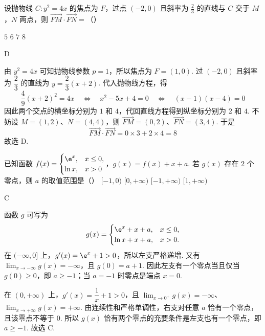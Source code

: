 \begin{problem}
设抛物线 \(C:y^2=4x\) 的焦点为 \(F\)，过点 \((-2,0)\) 且斜率为 \(\frac23\) 的直线与 \(C\) 交于 \(M\)，\(N\) 两点，则 \(\overrightarrow{FM}\cdot\overrightarrow{FN}=\)（\quad）

\choices
    {\(5\)}
    {\(6\)}
    {\(7\)}
    {\(8\)}
\end{problem}

\begin{answer}
D
\end{answer}

\begin{solution}
由 \(y^2=4x\) 可知抛物线参数 \(p=1\)，所以焦点为 \(F=(1,0)\). 过 \((-2,0)\) 且斜率为 \(\dfrac23\) 的直线为 \(y=\dfrac23(x+2)\). 代入抛物线方程，得
\[
\frac49(x+2)^2=4x
\quad\Longleftrightarrow\quad
x^2-5x+4=0
\quad\Longleftrightarrow\quad
(x-1)(x-4)=0
\]
因此两个交点的横坐标分别为 \(1\) 和 \(4\)，代回直线方程得到纵坐标分别为 \(2\) 和 \(4\). 不妨设 \(M=(1,2)\)、\(N=(4,4)\)，则 \(\overrightarrow{FM}=(0,2)\)、\(\overrightarrow{FN}=(3,4)\). 于是
\[
\overrightarrow{FM}\cdot\overrightarrow{FN}=0\times3+2\times4=8
\]
故选 D.
\end{solution}

\begin{problem}
已知函数 \(f(x)=\begin{cases}
\e^x,&x\le0,\\
\ln x,&x>0
\end{cases}\)，\(g(x)=f(x)+x+a\). 若 \(g(x)\) 存在 \(2\text{ 个}\) 零点，则 \(a\) 的取值范围是（\quad）
\choices
    {\([-1,0)\)}
    {\([0,+\infty)\)}
    {\([-1,+\infty)\)}
    {\([1,+\infty)\)}
\end{problem}

\begin{answer}
C
\end{answer}

\begin{solution}
函数 \(g\) 可写为
\[
g(x)=
\begin{cases}
\e^x+x+a,&x\le0,\\
\ln x+x+a,&x>0.
\end{cases}
\]
在 \((-\infty,0]\) 上，\(g'(x)=\e^x+1>0\)，所以左支严格递增. 又有 \(\displaystyle\lim_{x\to-\infty}g(x)=-\infty\)，且 \(g(0)=a+1\). 因此左支有一个零点当且仅当 \(g(0)\ge0\)，即 \(a\ge-1\)；当 \(a=-1\) 时零点是端点 \(x=0\).

在 \((0,+\infty)\) 上，\(g'(x)=\dfrac1x+1>0\)，且 \(\displaystyle\lim_{x\to0^+}g(x)=-\infty\)、\(\displaystyle\lim_{x\to+\infty}g(x)=+\infty\). 由连续性和严格单调性，右支对任意 \(a\) 恰有一个零点，且该零点不等于 \(0\). 所以 \(g(x)\) 恰有两个零点的充要条件是左支也有一个零点，即 \(a\ge-1\). 故选 C.
\end{solution}

